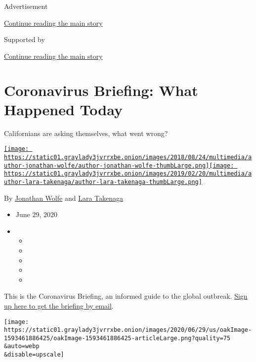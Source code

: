Advertisement

\protect\hyperlink{after-top}{Continue reading the main story}

Supported by

\protect\hyperlink{after-sponsor}{Continue reading the main story}

\hypertarget{coronavirus-briefing-what-happened-today}{%
\section{Coronavirus Briefing: What Happened
Today}\label{coronavirus-briefing-what-happened-today}}

Californians are asking themselves, what went wrong?

\href{https://www.nytimes3xbfgragh.onion/by/jonathan-wolfe}{\texttt{[image: https://static01.graylady3jvrrxbe.onion/images/2018/08/24/multimedia/author-jonathan-wolfe/author-jonathan-wolfe-thumbLarge.png]}}\href{https://www.nytimes3xbfgragh.onion/by/lara-takenaga}{\texttt{[image: https://static01.graylady3jvrrxbe.onion/images/2019/02/20/multimedia/author-lara-takenaga/author-lara-takenaga-thumbLarge.png]}}

By \href{https://www.nytimes3xbfgragh.onion/by/jonathan-wolfe}{Jonathan
Wolfe} and
\href{https://www.nytimes3xbfgragh.onion/by/lara-takenaga}{Lara
Takenaga}

\begin{itemize}
\item
  June 29, 2020
\item
  \begin{itemize}
  \item
  \item
  \item
  \item
  \item
  \end{itemize}
\end{itemize}

This is the Coronavirus Briefing, an informed guide to the global
outbreak.
\href{https://www.nytimes3xbfgragh.onion/newsletters/coronavirus-briefing}{Sign
up here to get the briefing by email}.

\texttt{[image: https://static01.graylady3jvrrxbe.onion/images/2020/06/29/us/oakImage-1593461886425/oakImage-1593461886425-articleLarge.png?quality=75\\\&auto=webp\\\&disable=upscale]}

